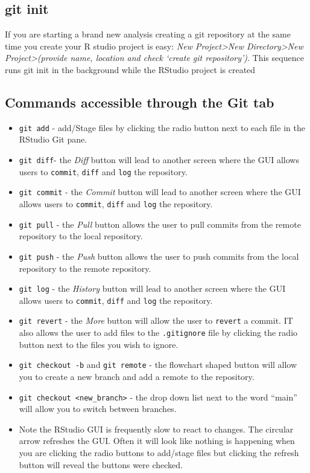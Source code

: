 \documentclass[
  letterpaper,
  DIV=11,
  numbers=noendperiod]{scrreprt}
\begin{document}
\hypertarget{git-init-1}{%
\subsection{git init}\label{git-init-1}}

If you are starting a brand new analysis creating a git repository at
the same time you create your R studio project is easy: \emph{New
Project\textgreater New Directory\textgreater New
Project\textgreater(provide name, location and check `create git
repository')}. This sequence runs git init in the background while the
RStudio project is created

\hypertarget{commands-accessible-through-the-git-tab}{%
\subsection{Commands accessible through the Git
tab}\label{commands-accessible-through-the-git-tab}}

\begin{itemize}
\item
  \texttt{git\ add} - add/Stage files by clicking the radio button next
  to each file in the RStudio Git pane.
\item
  \texttt{git\ diff}- the \emph{Diff} button will lead to another screen
  where the GUI allows users to \texttt{commit}, \texttt{diff} and
  \texttt{log} the repository.
\item
  \texttt{git\ commit} - the \emph{Commit} button will lead to another
  screen where the GUI allows users to \texttt{commit}, \texttt{diff}
  and \texttt{log} the repository.
\item
  \texttt{git\ pull} - the \emph{Pull} button allows the user to pull
  commits from the remote repository to the local repository.
\item
  \texttt{git\ push} - the \emph{Push} button allows the user to push
  commits from the local repository to the remote repository.
\item
  \texttt{git\ log} - the \emph{History} button will lead to another
  screen where the GUI allows users to \texttt{commit}, \texttt{diff}
  and \texttt{log} the repository.
\item
  \texttt{git\ revert} - the \emph{More} button will allow the user to
  \texttt{revert} a commit. IT also allows the user to add files to the
  \texttt{.gitignore} file by clicking the radio button next to the
  files you wish to ignore.
\item
  \texttt{git\ checkout\ -b} and \texttt{git\ remote} - the flowchart
  shaped button will allow you to create a new branch and add a remote
  to the repository.
\item
  \texttt{git\ checkout\ \textless{}new\_branch\textgreater{}} - the
  drop down list next to the word ``main'' will allow you to switch
  between branches.
\item
  Note the RStudio GUI is frequently slow to react to changes. The
  circular arrow refreshes the GUI. Often it will look like nothing is
  happening when you are clicking the radio buttons to add/stage files
  but clicking the refresh button will reveal the buttons were checked.
\end{itemize}
\end{document}
